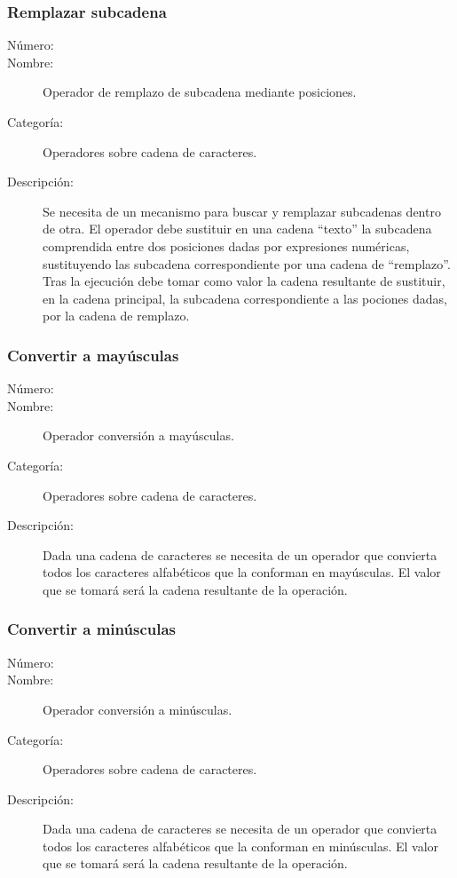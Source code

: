 \subsubsection{Remplazar subcadena}
\begin{framed}
	\begin{description}
		\item [Número:] \cn
		\item [Nombre:] Operador de remplazo de subcadena mediante posiciones.
		\item [Categoría:] Operadores sobre cadena de caracteres.
		\item [Descripción:] Se necesita de un mecanismo para buscar y remplazar subcadenas dentro de otra.
		El operador debe sustituir en una cadena ``texto'' la subcadena comprendida entre dos posiciones dadas por 
      expresiones numéricas, sustituyendo las subcadena correspondiente por una cadena de ``remplazo''. 
      Tras la ejecución debe tomar como valor la cadena
		resultante de sustituir, en la cadena principal, la subcadena correspondiente a las pociones dadas, por la cadena de remplazo.
      
	\end {description}
\end{framed}

\subsubsection{Convertir a mayúsculas}
\begin{framed}
	\begin{description}
		\item [Número:] \cn
		\item [Nombre:] Operador conversión a mayúsculas.
		\item [Categoría:] Operadores sobre cadena de caracteres.
		\item [Descripción:] Dada una cadena de caracteres se necesita de un operador que convierta todos los caracteres
		alfabéticos que la conforman en mayúsculas. El valor que se tomará será la cadena resultante de la operación.
	\end {description}
\end{framed}

\subsubsection{Convertir a minúsculas}
\begin{framed}
	\begin{description}
		\item [Número:] \cn
		\item [Nombre:] Operador conversión a minúsculas.
		\item [Categoría:] Operadores sobre cadena de caracteres.
		\item [Descripción:] Dada una cadena de caracteres se necesita de un operador que convierta todos los caracteres
		alfabéticos que la conforman en minúsculas. El valor que se tomará será la cadena resultante de la operación.
	\end {description}
\end{framed}
